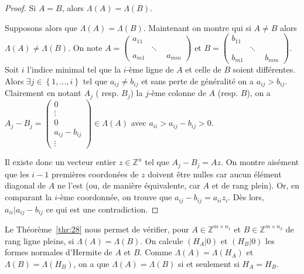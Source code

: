  \begin{proof}
   Si $A = B$, alors $Λ(A) = Λ(B)$.


   Supposons alors que $\Lambda(A) =\Lambda(B)$.  Maintenant on montre
   qui si $A\neq B$ alors $\Lambda(A) \neq \Lambda(B)$.  On note
   $A=\begin{pmatrix} a_{ 11 } & \quad & \quad \\ \quad & \ddots &
     \quad \\ a_{m1} & \quad & a_{ mm } \end{pmatrix}$ et
   $B=\begin{pmatrix} b_{ 11 } & \quad & \quad \\ \quad & \ddots &
     \quad \\ b_{m1} & \quad & b_{ mm } \end{pmatrix}$.  Soit $i$
   l'indice minimal tel que la $i$-ème ligne de $A$ et celle de $B$
   soient différentes. Alors
   $\exists j \in \left\{ 1,\dots ,i \right\}$ tel que
   $a_{ij} \neq b_{ij}$ et sans perte de généralité on a
   $a_{ij}>b_{ij}$. Clairement en notant $A_j$ ( resp. $B_j$) la
   $j$-ème colonne de $A$ (resp. $B$), on a
   $A_j - B_j = \begin{pmatrix} 0 \\ \vdots \\ 0\\ a_{ ij }-b_{ ij }
     \\ \vdots \end{pmatrix} \in \Lambda (A)$ avec
   $a_{ii}>a_{ij}-b_{ij}>0$.

   Il existe donc un vecteur entier $z ∈ℤ^n$ tel que
   $A_j - B_j = Az$. On montre aisément que les $i-1$ premières
   coordonées de $z$ doivent être nulles car aucun élément diagonal de
   $A$ ne l'est (ou, de manière équivalente, car $A$ et de rang
   plein). Or, en comparant la $i$-ème coordonnée, on trouve que
   $a_{ij} - b_{ij} = a_{ii} z_i$. Dès lors, $a_{ii}|a_{ij}-b_{ij}$ ce
   qui est une contradiction. 
 \end{proof}
  \begin{remark}
    \label{rem:5}
    Le Théorème~\ref{thr:28} nous permet de vérifier, pour
    $A ∈ℤ^{m × n_1}$ et $B ∈ℤ^{m × n_2}$ de rang ligne pleins, si
    $Λ(A) = Λ(B)$.  On calcule $(H_A|0)$ et $(H_B|0)$ les formes
    normales d'Hermite de $A$ et $B$. Comme $Λ(A) =Λ(H_A)$ et
    $Λ(B) = Λ(H_B)$, on a que $Λ(A) = Λ(B)$ si et seulement si
    $H_A = H_B$.
  \end{remark} 
  
